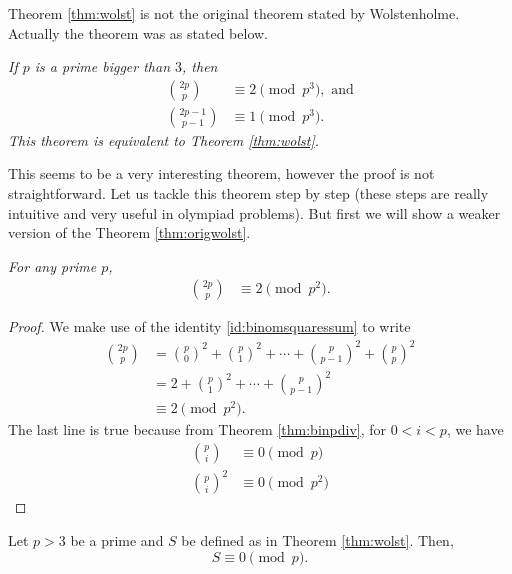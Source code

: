 \documentclass[12pt]{subfile}
\begin{document}
		\begin{remark}
			Theorem \eqref{thm:wolst} is not the original theorem stated by Wolstenholme. Actually the theorem was as stated below.
		\end{remark}

		\begin{theorem}\slshape\label{thm:origwolst}
			If $p$ is a prime bigger than $3$, then
			\begin{align*}
				\binom{2p}{p} & \equiv2\pmod{p^3}, \text{ and}\\
				\binom{2p-1}{p-1} & \equiv 1 \pmod{p^3}.
			\end{align*}
			This theorem is equivalent to Theorem \ref{thm:wolst}.
		\end{theorem}
	This seems to be a very interesting theorem, however the proof is not straightforward. Let us tackle this theorem step by step (these steps are really intuitive and very useful in olympiad problems). But first we will show a weaker version of the Theorem \ref{thm:origwolst}.
		\begin{theorem}\slshape
			For any prime $p$,
				\begin{align*}
					\binom{2p}{p} & \equiv2\pmod{p^2}.
				\end{align*}
		\end{theorem}

		\begin{proof}
			We make use of the identity \eqref{id:binomsquaressum} to write
				\begin{align*}
					\binom{2p}p & = \binom{p}0^2+\binom{p}{1}^2+\cdots+\binom{p}{p-1}^2+\binom{p}{p}^2\\
								& = 2+\binom{p}{1}^2+\cdots+\binom{p}{p-1}^2\\
								& \equiv2\pmod{p^2}.
				\end{align*}
			The last line is true because from Theorem \ref{thm:binpdiv}, for $0<i<p$, we have
				\begin{align*}
					\binom{p}{i}
						& \equiv 0\pmod p\\
					\binom{p}{i}^2
						& \equiv 0\pmod{p^2}
				\end{align*}
		\end{proof}

		\begin{lemma}\label{lem:wolstproof1}
			Let $p>3$ be a prime and $S$ be defined as in Theorem \ref{thm:wolst}. Then, $$S \equiv 0 \pmod p.$$
		\end{lemma}
\end{document}
